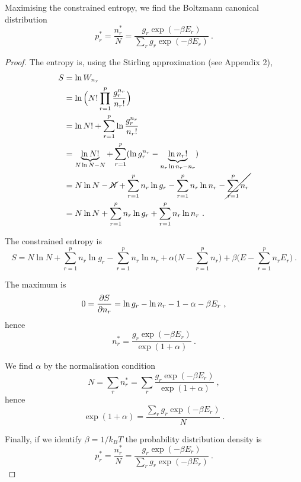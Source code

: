     Maximising the constrained entropy, we find the Boltzmann canonical distribution 
    \begin{equation*}
        p_r^* = \frac{n_r^*}{N} = \frac{g_r \exp(- \beta E_r)}{\sum_r g_r \exp(- \beta E_r)} ~.
    \end{equation*}
    \begin{proof}
        The entropy is, using the Stirling approximation (see Appendix 2),
        \begin{equation*}
        \begin{aligned}
            S & = \ln W_{n_r} \\ & = \ln \Big (N! \prod_{r=1}^p \frac{g_r^{n_r}}{n_r!} \Big) \\ & = \ln N! + \sum_{r=1}^p \ln \frac{g_r^{n_r}}{n_r!} \\ & = \underbrace{\ln N!}_{N \ln N - N} + \sum_{r=1}^p (\ln g_r^{n_r} - \underbrace{\ln n_r!}_{n_r \ln n_r - n_r} ) \\ & = N \ln N - \cancel{N} + \sum_{r=1}^p n_r \ln g_r - \sum_{r=1}^p n_r \ln n_r - \cancel{\sum_{r=1}^p n_r} \\ & = N \ln N + \sum_{r=1}^p n_r \ln g_r + \sum_{r=1}^p n_r \ln n_r ~.
        \end{aligned}
        \end{equation*}

        The constrained entropy is
        \begin{equation*}
            S =  N \ln N + \sum_{r=1}^p n_r \ln g_r - \sum_{r=1}^p n_r \ln n_r + \alpha \Big (N - \sum_{r=1}^p n_r \Big) + \beta \Big (E - \sum_{r=1}^p n_r E_r \Big ) ~.
        \end{equation*}

        The maximum is 
        \begin{equation*}
            0 = \frac{\partial S}{\partial n_r} = \ln g_r - \ln n_r - 1 - \alpha - \beta E_r ~,
        \end{equation*}
        hence 
        \begin{equation*}
            n_r^* = \frac{g_r \exp(- \beta E_r)}{\exp(1 + \alpha)} ~.
        \end{equation*}

        We find $\alpha$ by the normalisation condition 
        \begin{equation*}
            N = \sum_r n_r^* = \sum_r \frac{g_r \exp(- \beta E_r)}{\exp(1 + \alpha)} ~,
        \end{equation*}
        hence 
        \begin{equation*}
            \exp(1 + \alpha) = \frac{\sum_r g_r \exp(- \beta E_r)}{N} ~.
        \end{equation*}

        Finally, if we identify $\beta = 1/k_B T$ the probability distribution density is
        \begin{equation*}
            p_r^* = \frac{n_r^*}{N} = \frac{g_r \exp(- \beta E_r)}{\sum_r g_r \exp(- \beta E_r)} ~.
        \end{equation*}
    \end{proof}

